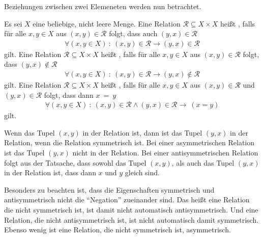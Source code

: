 \begin{Unit}
Beziehun\-gen zwischen zwei Elemeneten werden nun betrachtet.
\begin{Definition}
  Es sei $X$ eine beliebige, nicht leere Menge. Eine Relation $\mathcal{R} 
  \subseteq X \times X$ heißt , falls für alle 
  $x, y \in X$ aus $(x, y) \in \mathcal{R}$ folgt, dass auch $(y, x) \in 
  \mathcal{R}$ 
  \begin{align}
    \forall (x,y \in X)\ :\ (x, y) \in \mathcal{R} \rightarrow (y, x) \in 
      \mathcal{R}
  \end{align}
  gilt. Eine Relation $\mathcal{R} \subseteq X \times X$ heißt 
  , falls für alle $x, y \in X$ aus $(x, y) \in 
  \mathcal{R}$ folgt, dass $(y, x) \notin \mathcal{R}$
  \begin{align}
    \forall (x,y \in X)\ :\ (x, y) \in \mathcal{R} \rightarrow (y, x) \notin 
      \mathcal{R}
  \end{align} 
  gilt. Eine Relation $\mathcal{R} \subseteq X \times X$ heißt 
  , falls für alle $x, y \in X$ aus $(x, y) \in 
  \mathcal{R}$ und $(y, x) \in \mathcal{R}$ folgt, dass dann $x\ =\ y$
  \begin{align}
    \forall (x, y \in X)\ :\ (x, y) \in \mathcal{R} \land (y, x) \in 
      \mathcal{R} \rightarrow\ (x = y)
  \end{align}
  gilt.
\end{Definition}
Wenn das Tupel $(x,y)$ in der Relation ist, dann ist das Tupel $(y,x)$ in der 
Relation, wenn die Relation symmetrisch ist. Bei einer asymmetrischen Relation
ist das Tupel $(y,x)$ nicht in der Relation. Bei einer antisymmetrischen 
Relation folgt aus der Tatsache, dass sowohl das Tupel $(x,y)$, als auch das 
Tupel $(y,x)$ in der Relation ist, dass dann $x$ und $y$ gleich sind.

Besonders zu beachten ist, dass die Eigenschaften symmetrisch und 
antisymmetrisch nicht die \enquote{Negation} zueinander sind. Das heißt eine
Relation die nicht symmetrisch ist, ist damit nicht automatisch
antisymmetrisch. Und eine Relation, die nicht antisymmetrisch ist, ist
nicht automatisch damit symmetrisch. Ebenso wenig ist eine Relation, die
nicht symmetrisch ist, asymmetrisch.
\end{Unit}

